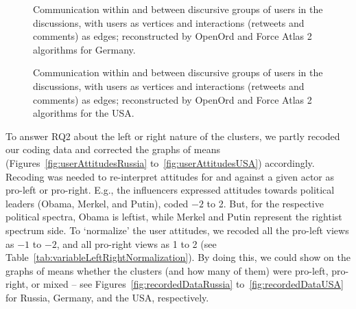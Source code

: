 \begin{figure}[ht]
	\caption{Communication within and between discursive groups of users in the discussions, with users as vertices and interactions (retweets and comments) as edges; reconstructed by OpenOrd and Force Atlas 2 algorithms for Germany.}\label{fig:openOrdGermany}
\end{figure}

\begin{figure}[ht]
	\caption{Communication within and between discursive groups of users in the discussions, with users as vertices and interactions (retweets and comments) as edges; reconstructed by OpenOrd and Force Atlas 2 algorithms for the USA.}\label{fig:openOrdUSA}
\end{figure}

To answer RQ2 about the left or right nature of the clusters, we partly recoded our coding data and corrected the graphs of means (Figures~\cref{fig:userAttitudesRussia} to~\cref{fig:userAttitudesUSA}) accordingly. Recoding was needed to re-interpret attitudes for and against a given actor as pro-left or pro-right. E.g., the influencers expressed attitudes towards political leaders (Obama, Merkel, and Putin), coded \(-2\) to 2. But, for the respective political spectra, Obama is leftist, while Merkel and Putin \cite{BluhmVarga} represent the rightist spectrum side. To ‘normalize’ the user attitudes, we recoded all the pro-left views as \(-1\) to \(-2\), and all pro-right views as 1 to 2 (see Table~\cref{tab:variableLeftRightNormalization}). By doing this, we could show on the graphs of means whether the clusters (and how many of them) were pro-left, pro-right, or mixed -- see Figures~\cref{fig:recordedDataRussia} to~\cref{fig:recordedDataUSA} for Russia, Germany, and the USA, respectively.

